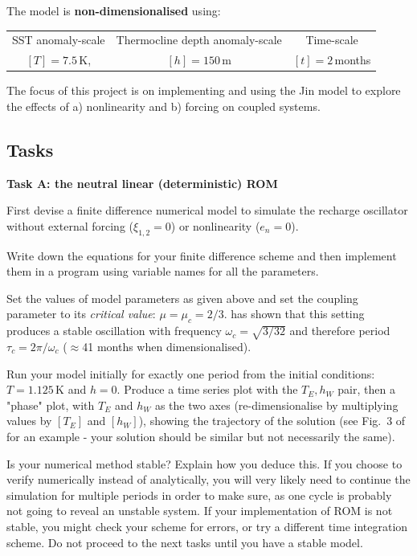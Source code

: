 \documentclass[11pt,a4paper]{article}
\begin{document}
\pagebreak

The model is \textbf{non-dimensionalised} using:
\begin{table}[ht]
\centering
\begin{tabular}{|c|c|c|}
		 \hline SST anomaly-scale & Thermocline depth anomaly-scale & Time-scale \\
		$[T]=7.5\,$K, & $[h]=150\,$m & $[t]=2\,$months \\
		\hline
\end{tabular}
\end{table}

The focus of this project is on implementing and using the Jin model to explore the effects of
a) nonlinearity and b) forcing on coupled systems.

\subsection*{\Large\bf{Tasks}}
{\large\bf Task A: the neutral linear (deterministic) ROM}

First devise a finite difference numerical model to simulate the
recharge oscillator without external forcing ($\xi_{1,2}=0$) or nonlinearity
($e_n=0$).

Write down the equations for your finite difference scheme and then
implement them in a program using variable names for all the
parameters.

Set the values of model parameters as given above and set the coupling parameter to its {\em critical value}:
$\mu=\mu_c=2/3$. \cite{jin:97a} has shown that this setting produces a
stable oscillation with frequency $\omega_c=\sqrt{3/32}$ and therefore
period $\tau_c=2\pi/\omega_c$ ($\approx$41 months when
dimensionalised). 

Run your model initially for exactly one period from the initial conditions: $T=1.125\,$K
and $h=0$. Produce a time series plot with the $T_E,h_W$ pair, then a "phase" plot, with $T_E$ and $h_W$ as the two axes
(re-dimensionalise by multiplying values by $[T_E]$ and $[h_W]$), showing
the trajectory of the solution (see Fig.~3 of \cite{jin:97a} for an
example - your solution should be similar but not necessarily the
same). 

Is your numerical method stable? Explain how you deduce
this. If you choose to verify numerically instead of analytically, you will very likely need to continue the simulation for multiple periods in order to make sure, as one cycle is probably not going to reveal an unstable system.
If your implementation of ROM is not stable, you might check your scheme for errors, or
try a different time integration scheme. Do not proceed to the next tasks until you have a stable model.
\end{document}
